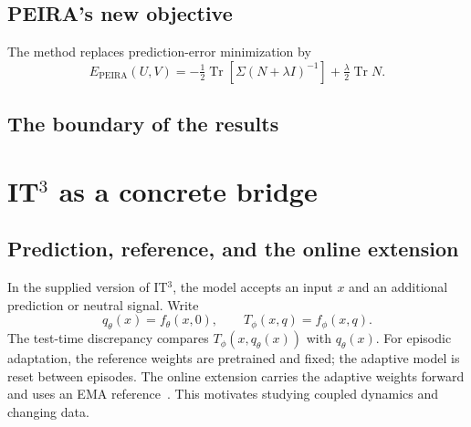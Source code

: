 \documentclass[11pt,a4paper]{article}
\newcommand{\Tr}{\operatorname{Tr}}
\newif\ifdraftnotes
\newcommand{\draftnote}[1]{\ifdraftnotes\par\smallskip
  {\small\color{gray}\noindent\textit{To develop:} #1\par}\smallskip\fi}
\begin{document}
\subsection{PEIRA's new objective}
The method replaces prediction-error minimization by
\begin{equation}
 E_{\mathrm{PEIRA}}(U,V)
 =-\tfrac12\Tr[\Sigma(N+\lambda I)^{-1}]
   +\tfrac\lambda2\Tr N.
\end{equation}
\draftnote{Explain why this objective differs from the self-distillation
certificate. Use a canonical-mode calculation to show the threshold
$c>\lambda^2$, then state the full leading-subspace result with its assumptions.
Distinguish zero collapse from constant representations and clarify when
eligible nonconstant modes exist.}

\subsection{The boundary of the results}
\draftnote{Separate three issues: finite-speed predictor optimization; EMA
teacher dynamics; neural-network parameterization and stochastic training.
PEIRA leaves teacher-EMA convergence and stability to future work (footnote 2).
Its practical auxiliary-gradient algorithm also uses EMA feature statistics;
this is distinct from an EMA teacher. The exact auxiliary-gradient identity
is useful for studying when detached computations still implement an objective.}

\section{\texorpdfstring{IT$^3$}{IT3} as a concrete bridge}
\label{sec:it3}
\subsection{Prediction, reference, and the online extension}
In the supplied version of IT$^3$, the model accepts an input $x$ and an
additional prediction or neutral signal. Write
\[
 q_\theta(x)=f_\theta(x,0),\qquad T_\phi(x,q)=f_\phi(x,q).
\]
The test-time discrepancy compares $T_\phi(x,q_\theta(x))$ with $q_\theta(x)$.
For episodic adaptation, the reference weights are pretrained and fixed;
the adaptive model is reset between episodes. The online extension carries
the adaptive weights forward and uses an EMA reference~\cite[Sections 3.2--3.3]{it3}.
This motivates studying coupled dynamics and changing data.
\end{document}
